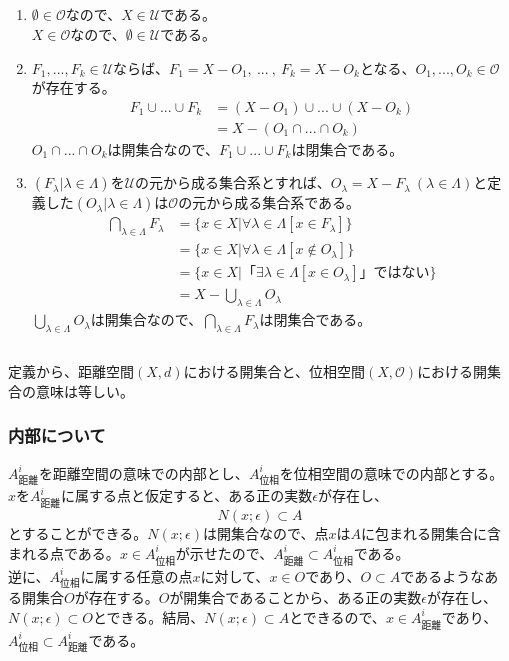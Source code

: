 \documentclass{jsarticle}
\begin{document}
\subsection{}
\begin{enumerate}
\item
$\emptyset \in \mathcal{O}$なので、$X\in\mathcal{U}$である。\\
$X \in \mathcal{O}$なので、$\emptyset \in \mathcal{U}$である。
\item
$F_1,...,F_k\in\mathcal{U}$ならば、$F_1=X-O_1,\ ...\ ,\ F_k=X-O_k$となる、$O_1,...,O_k\in\mathcal{O}$が存在する。
\begin{align*}
F_1\cup ...\cup F_k&=(X-O_1)\cup...\cup(X-O_k)\\
&=X-(O_1\cap...\cap O_k)
\end{align*}
$O_1\cap...\cap O_k$は開集合なので、$F_1\cup...\cup F_k$は閉集合である。

\item
$(F_\lambda|\lambda\in\Lambda)$を$\mathcal{U}$の元から成る集合系とすれば、$O_\lambda=X-F_\lambda \ (\lambda\in\Lambda)$と定義した$(O_\lambda|\lambda\in\Lambda)$は$\mathcal{O}$の元から成る集合系である。
\begin{align*}
\bigcap_{\lambda\in\Lambda}F_\lambda&=\{x\in X|\forall\lambda\in\Lambda[x\in F_\lambda]\}\\
&=\{x\in X|\forall\lambda\in\Lambda[x\notin O_\lambda]\}\\
&=\{x\in X|「\exists\lambda\in\Lambda[x\in O_\lambda]」ではない\}\\
&=X-\bigcup_{\lambda\in\Lambda}O_\lambda
\end{align*}
$\bigcup_{\lambda\in\Lambda}O_\lambda$は開集合なので、$\bigcap_{\lambda\in\Lambda}F_\lambda$は閉集合である。
\end{enumerate}


\subsection{}
定義から、距離空間$(X,d)$における開集合と、位相空間$(X,\mathcal{O})$における開集合の意味は等しい。\\
\subsubsection{内部について}
$A^i_{距離}$を距離空間の意味での内部とし、$A^i_{位相}$を位相空間の意味での内部とする。\\
$x$を$A^i_{距離}$に属する点と仮定すると、ある正の実数$\epsilon$が存在し、
\[N(x;\epsilon)\subset A\]
とすることができる。$N(x;\epsilon)$は開集合なので、点$x$は$A$に包まれる開集合に含まれる点である。$x\in A^i_{位相}$が示せたので、$A^i_{距離}\subset A^i_{位相}$である。\\
逆に、$A^i_{位相}$に属する任意の点$x$に対して、$x\in O$であり、$O\subset A$であるようなある開集合$O$が存在する。$O$が開集合であることから、ある正の実数$\epsilon$が存在し、$N(x;\epsilon)\subset O$とできる。結局、$N(x;\epsilon)\subset A$とできるので、$x\in A^i_{距離}$であり、$A^i_{位相}\subset A^i_{距離}$である。
\end{document}
